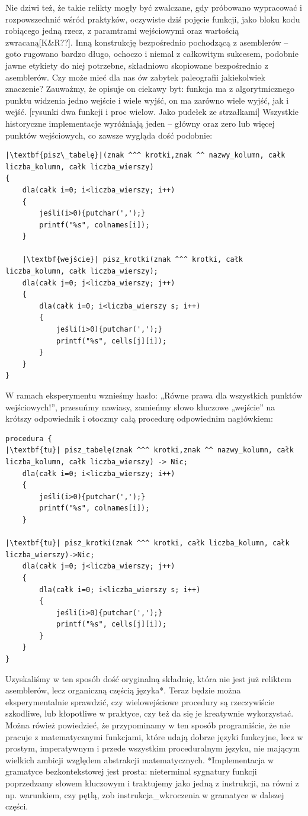 Nie dziwi też, że takie relikty mogły być zwalczane, gdy próbowano wypracować i rozpowszechnić wśród praktyków, oczywiste dziś pojęcie funkcji, jako bloku kodu robiącego jedną rzecz, z paramtrami wejściowymi oraz wartością zwracaną[K\&R??]. Inną konstrukcję bezpośrednio pochodzącą z asemblerów – goto rugowano bardzo długo, ochoczo i niemal z całkowitym sukcesem, podobnie jawne etykiety do niej potrzebne, składniowo skopiowane bezpośrednio z asemblerów. Czy może mieć dla nas ów zabytek paleografii jakiekolwiek znaczenie? Zauważmy, że opisuje on ciekawy byt: funkcja ma z algorytmicznego punktu widzenia jedno wejście i wiele wyjść, on ma zarówno wiele wyjść, jak i wejść.
[rysunki dwa funkcji i proc wielow. Jako pudełek ze strzałkami]
Wszystkie historyczne implementacje wyróżniają jeden – główny oraz zero lub więcej punktów wejściowych, co zawsze wygląda dość podobnie:
\lstset{
    escapechar=|,
    breaklines=true
}
\begin{lstlisting}
|\textbf{pisz\_tabelę}|(znak ^^^ krotki,znak ^^ nazwy_kolumn, całk liczba_kolumn, całk liczba_wierszy)
{
    dla(całk i=0; i<liczba_wierszy; i++)
    {
        jeśli(i>0){putchar(',');}
        printf("%s", colnames[i]);
    }
    
    |\textbf{wejście}| pisz_krotki(znak ^^^ krotki, całk liczba_kolumn, całk liczba_wierszy);
    dla(całk j=0; j<liczba_wierszy; j++)
    {
        dla(całk i=0; i<liczba_wierszy s; i++)
        {
            jeśli(i>0){putchar(',');}
            printf("%s", cells[j][i]);
        }
    }
}
\end{lstlisting}
W ramach eksperymentu wznieśmy hasło: „Równe prawa dla wszystkich punktów wejściowych!”, przesuńmy nawiasy,  zamieńmy słowo kluczowe „wejście” na krótszy odpowiednik i otoczmy całą procedurę odpowiednim nagłówkiem:
\begin{lstlisting}
procedura {
|\textbf{tu}| pisz_tabelę(znak ^^^ krotki,znak ^^ nazwy_kolumn, całk liczba_kolumn, całk liczba_wierszy) -> Nic;
    dla(całk i=0; i<liczba_wierszy; i++)
    {
        jeśli(i>0){putchar(',');}
        printf("%s", colnames[i]);
    }
    
|\textbf{tu}| pisz_krotki(znak ^^^ krotki, całk liczba_kolumn, całk liczba_wierszy)->Nic;
    dla(całk j=0; j<liczba_wierszy; j++)
    {
        dla(całk i=0; i<liczba_wierszy s; i++)
        {
            jeśli(i>0){putchar(',');}
            printf("%s", cells[j][i]);
        }
    }
}
\end{lstlisting}
Uzyskaliśmy w ten sposób dość oryginalną składnię, która nie jest już reliktem asemblerów, lecz organiczną częścią języka*. Teraz będzie można eksperymentalnie sprawdzić, czy wielowejściowe procedury są rzeczywiście szkodliwe, lub kłopotliwe w praktyce, czy też da się je kreatywnie wykorzystać. Można rówież powiedzieć, że przypominamy w ten sposób programiście, że nie pracuje z matematycznymi funkcjami, które udają dobrze języki funkcyjne, lecz w prostym, imperatywnym i przede wszystkim proceduralnym języku, nie mającym wielkich ambicji względem abstrakcji matematycznych.
*Implementacja w gramatyce bezkontekstowej jest prosta: nieterminal sygnatury funkcji  poprzedzamy słowem kluczowym i traktujemy jako jedną z instrukcji, na równi z np. warunkiem, czy pętlą, zob instrukcja\_wkroczenia w gramatyce w dalszej części.

